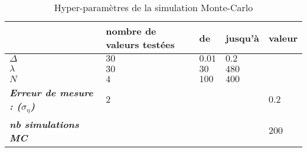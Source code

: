 \begin{table}[H]
	\centering
	\begin{tabular}{l|l|ll|l|}
		\cline{2-5}
		\textbf{}                                                         & \textbf{nombre de valeurs testées} & \multicolumn{1}{l|}{\textbf{de}} & \textbf{jusqu'à}         & \textbf{valeur}          \\ \hline
		\multicolumn{1}{|l|}{\textit{\textbf{$\Delta$}}}                  & $30$                               & $0.01$                           & $0.2$                    & \cellcolor[HTML]{C0C0C0} \\
		\multicolumn{1}{|l|}{\textit{\textbf{$\lambda$}}}                 & $30$                               & $30$                             & $480$                    & \cellcolor[HTML]{C0C0C0} \\
		\multicolumn{1}{|l|}{\textit{\textbf{$N$}}}                       & $4$                                & $100$                            & $400$                    & \cellcolor[HTML]{C0C0C0} \\
		\multicolumn{1}{|l|}{\textit{\textbf{Erreur de mesure : ($\sigma_\eta$)}}} & $2$                                & \cellcolor[HTML]{C0C0C0}         & \cellcolor[HTML]{C0C0C0} & $0.2$               \\
		\multicolumn{1}{|l|}{\textit{\textbf{nb simulations MC}}}         & \cellcolor[HTML]{C0C0C0}           & \cellcolor[HTML]{C0C0C0}         & \cellcolor[HTML]{C0C0C0} & $200$                    \\ \hline
	\end{tabular}
	\caption{Hyper-paramètres de la simulation Monte-Carlo}
	\label{tab:hyperparam-mc}
\end{table}
